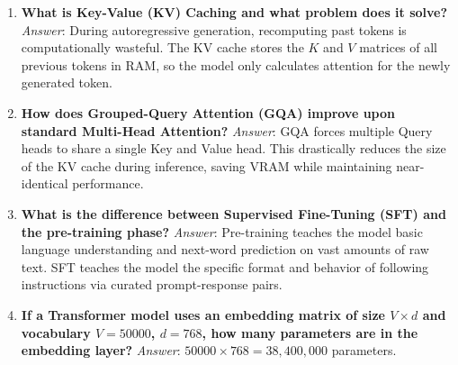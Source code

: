 \documentclass[11pt, a4paper]{article}
\begin{document}
\begin{enumerate}[label=\textbf{Q\arabic*.}]
\item \textbf{What is Key-Value (KV) Caching and what problem does it solve?}  
\textit{Answer}: During autoregressive generation, recomputing past tokens is computationally wasteful. The KV cache stores the $K$ and $V$ matrices of all previous tokens in RAM, so the model only calculates attention for the newly generated token.

\item \textbf{How does Grouped-Query Attention (GQA) improve upon standard Multi-Head Attention?}  
\textit{Answer}: GQA forces multiple Query heads to share a single Key and Value head. This drastically reduces the size of the KV cache during inference, saving VRAM while maintaining near-identical performance.

\item \textbf{What is the difference between Supervised Fine-Tuning (SFT) and the pre-training phase?}  
\textit{Answer}: Pre-training teaches the model basic language understanding and next-word prediction on vast amounts of raw text. SFT teaches the model the specific format and behavior of following instructions via curated prompt-response pairs.

\item \textbf{If a Transformer model uses an embedding matrix of size $V\times d$ and vocabulary $V=50000$, $d=768$, how many parameters are in the embedding layer?}  
\textit{Answer}: $50000 \times 768 = 38{,}400{,}000$ parameters.

\end{enumerate}
\newpage
\end{document}
